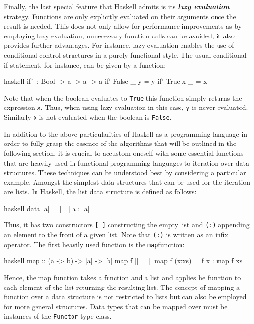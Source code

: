 Finally, the last special feature that Haskell admits is its \textit{\textbf{lazy evaluation}} strategy. Functions are only explicitly evaluated on their arguments once the result is needed. This does not only allow for performance improvements as by employing lazy evaluation, unnecessary function calls can be avoided; it also provides further advantages. For instance, lazy evaluation enables the use of conditional control structures in a purely functional style. The usual conditional if statement, for instance, can be given by a function:
\begin{center}
\begin{cminted}{haskell}
if' :: Bool -> a -> a -> a
if' False _ y = y 
if' True x _ = x 
\end{cminted}
\end{center}
Note that when the boolean evaluates to \texttt{True} this function simply returns the expression \texttt{x}. Thus, when using lazy evaluation in this case, \texttt{y} is never evaluated. Similarly \texttt{x} is not evaluated when the boolean is \texttt{False}. 

In addition to the above particularities of Haskell as a programming language in order to fully grasp the essence of the algorithms that will be outlined in the following section, it is crucial to accustom oneself with some essential functions that are heavily used in functional programming languages to iteration over data structures. These techniques can be understood best by considering a particular example. Amongst the simplest data structures that can be used for the iteration are lists. In Haskell, the list data structure is defined as follows: 
\begin{center}
\begin{cminted}{haskell}
data [a] = [ ] | a : [a] 
\end{cminted}
\end{center}
Thus, it has two constructors \texttt{[ ]} constructing the empty list and \texttt{(:)} appending an element to the front of a given list. Note that \texttt{(:)} is written as an infix operator.
The first heavily used function is the \texttt{map}function:
\begin{center}
\begin{cminted}{haskell}
map :: (a -> b) -> [a] -> [b]
map f [] = [] 
map f (x:xs) =  f x : map f xs 
\end{cminted}
\end{center}
Hence, the map function takes a function and a list and applies he function to each element of the list returning the resulting list.
The concept of mapping a function over a data structure is not restricted to lists but can also be employed for more general structures. Data types that can be mapped over must be instances of the \texttt{Functor} type class.


